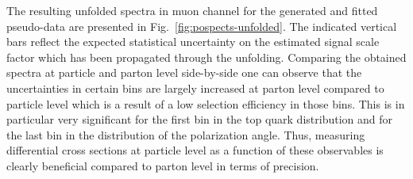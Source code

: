 {\hspace{0.02\textwidth}
}

The resulting unfolded spectra in muon channel for the generated and fitted pseudo-data are presented in Fig.~\ref{fig:pospects-unfolded}. The indicated vertical bars reflect the expected statistical uncertainty on the estimated signal scale factor which has been propagated through the unfolding. Comparing the obtained spectra at particle and parton level side-by-side one can observe that the uncertainties in certain bins are largely increased at parton level compared to particle level which is a result of a low selection efficiency in those bins. This is in particular very significant for the first bin in the top quark \pt distribution and for the last bin in the distribution of the polarization angle. Thus, measuring differential cross sections at particle level as a function of these observables is clearly beneficial compared to parton level in terms of precision.

